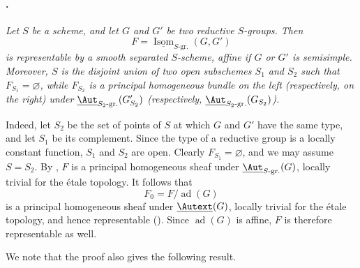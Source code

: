 

\paragraph{.}
\emph{Let \(S\) be a scheme, and let \(G\) and \(G'\) be two
reductive \(S\)-groups. Then}
\[
  F=\underline{\operatorname{Isom}}_{S\text{-}\mathrm{gr.}}(G,G')
\]
\emph{is representable by a smooth separated \(S\)-scheme, affine
if \(G\) or \(G'\) is semisimple. Moreover, \(S\) is the disjoint
union of two open subschemes \(S_1\) and \(S_2\) such that
\(F_{S_1}=\varnothing\), while \(F_{S_2}\) is a principal homogeneous
bundle on the left \textup{(respectively, on the right)} under
\(\underline{\Aut}_{S_2\text{-}\mathrm{gr.}}(G'_{S_2})\)
\textup{(respectively,
\(\underline{\Aut}_{S_2\text{-}\mathrm{gr.}}(G_{S_2})\)).}}

Indeed, let \(S_2\) be the set of points of \(S\) at which \(G\) and
\(G'\) have the same type, and let \(S_1\) be its complement. Since
the type of a reductive group is a locally constant function, \(S_1\)
and \(S_2\) are open. Clearly \(F_{S_1}=\varnothing\), and we may
assume \(S=S_2\). By , \(F\) is a principal
homogeneous sheaf under
\(\underline{\Aut}_{S\text{-}\mathrm{gr.}}(G)\), locally trivial for
the étale topology. It follows that
\[
  F_0=F/\operatorname{ad}(G)
\]
is a principal homogeneous sheaf under \(\underline{\Autext}(G)\),
locally trivial for the étale topology, and hence representable
\textup{()}. Since \(\operatorname{ad}(G)\) is affine,
\(F\) is therefore representable as well.

We note that the proof also gives the following result.

